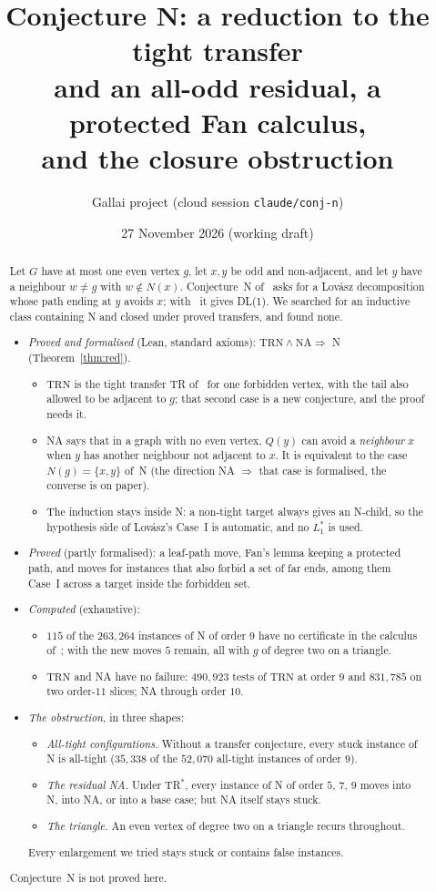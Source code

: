 \documentclass[11pt]{amsart}
\title[Conjecture N]{Conjecture N: a reduction to the tight transfer\\
and an all-odd residual, a protected Fan calculus,\\ and the closure obstruction}
\author{Gallai project (cloud session \texttt{claude/conj-n})}
\date{27 November 2026 (working draft)}
\theoremstyle{definition}
\newcommand{\TRN}{\mathrm{TRN}}
\newcommand{\NA}{\mathrm{NA}}
\begin{document}
\begin{abstract}
Let $G$ have at most one even vertex $g$, let $x,y$ be odd and non-adjacent, and let $y$ have a
neighbour $w\ne g$ with $w\notin N(x)$. Conjecture~N of~\cite{DL} asks for a Lov\'asz
decomposition whose path ending at $y$ avoids $x$; with~\cite[Prop.~9.2]{DL} it gives DL(1). We
searched for an inductive class containing N and closed under proved transfers, and found none.
\begin{itemize}
\item \emph{Proved and formalised} (Lean, standard axioms): $\TRN\wedge\NA\Rightarrow$ N
(Theorem~\ref{thm:red}).
  \begin{itemize}
  \item $\TRN$ is the tight transfer TR of~\cite{L1I} for one forbidden vertex, with the tail also
  allowed to be adjacent to $g$; that second case is a new conjecture, and the proof needs it.
  \item NA says that in a graph with no even vertex, $Q(y)$ can avoid a \emph{neighbour} $x$ when
  $y$ has another neighbour not adjacent to $x$. It is equivalent to the case $N(g)=\{x,y\}$ of~N
  (the direction NA $\Rightarrow$ that case is formalised, the converse is on paper).
  \item The induction stays inside N: a non-tight target always gives an N-child, so the hypothesis
  side of Lov\'asz's Case~I is automatic, and no $L_1^*$ is used.
  \end{itemize}
\item \emph{Proved} (partly formalised): a leaf-path move, Fan's lemma keeping a protected path,
and moves for instances that also forbid a set of far ends, among them Case~I across a target
inside the forbidden set.
\item \emph{Computed} (exhaustive):
  \begin{itemize}
  \item $115$ of the $263{,}264$ instances of N of order $9$ have no certificate in the calculus
  of~\cite{L1I}; with the new moves $5$ remain, all with $g$ of degree two on a triangle.
  \item $\TRN$ and NA have no failure: $490{,}923$ tests of $\TRN$ at order $9$ and $831{,}785$ on
  two order-$11$ slices; NA through order $10$.
  \end{itemize}
\item \emph{The obstruction}, in three shapes:
  \begin{itemize}
  \item \emph{All-tight configurations.} Without a transfer conjecture, every stuck instance of N
  is all-tight ($35{,}338$ of the $52{,}070$ all-tight instances of order $9$).
  \item \emph{The residual NA.} Under TR$^*$, every instance of N of order $5$, $7$, $9$ moves
  into N, into NA, or into a base case; but NA itself stays stuck.
  \item \emph{The triangle.} An even vertex of degree two on a triangle recurs throughout.
  \end{itemize}
  Every enlargement we tried stays stuck or contains false instances.
\end{itemize}
Conjecture~N is not proved here.
\end{abstract}
\end{document}
